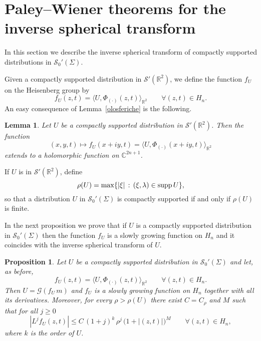 \documentclass[12pt,a4paper]{amsart}
\theoremstyle{plain}
\newtheorem{lemma}[theorem]{Lemma}
\newtheorem{proposition}[theorem]{Proposition}
\theoremstyle{definition}
\numberwithin{equation}{section}
\begin{document}
\section{Paley--Wiener theorems for the inverse spherical transform }

In this section we describe the inverse spherical transform
of compactly supported distributions in ${\mathcal S}_0'({\Sigma})$.

Given a compactly supported distribution in ${\mathcal S}'({\mathbb R}^2)$,
we define the function $f_U$ on the Heisenberg group by
$$
f_U(z,t)={\langle {U},{\Phi_{(\cdot)}(z,t)} \rangle_{{\mathbb R}^2}}\qquad \forall  (z,t)\in{{H_{n}}}.
$$ 
An easy consequence of 
 Lemma~\ref{olosferiche} is the following.

\begin{lemma}\label{oloinv}
Let $U$ be a compactly supported distribution in ${\mathcal S}'({\mathbb R}^2)$.
 Then the function
$$
(x,y,t)\mapsto f_U(x+iy,t)={\langle {U},{\Phi_{(\cdot)}(x+iy,t)} \rangle_{{\mathbb R}^2}}
$$ 
extends to a holomorphic function   on ${\mathbb C}^{2{n}+1}$.
\end{lemma}
 

If $U$ is in ${\mathcal S}'({\mathbb R}^2)$, define
 $$
{\rho} (U)=
{\rm max}{\left\{{|\xi|\, :\, (\xi,{\lambda})\in {\rm supp}\, U}\right\}},
$$
 so that
  a distribution $U$ in ${\mathcal S}_0'({\Sigma})$  is compactly supported 
 if and only if $\rho(U)$ is finite.

In the next proposition we prove that if $U$ is 
a compactly supported distribution in ${\mathcal S}_0'({\Sigma})$ then the function $f_U$
is a slowly growing function on ${{H_{n}}}$ and it coincides with 
the inverse spherical transform of $U$.   

\begin{proposition}\label{invtemp}
Let $U$ be a compactly supported distribution in ${\mathcal S}_0'({\Sigma})$ and let, as before,
$$
f_U(z,t)={\langle {U},{\Phi_{(\cdot)}(z,t)} \rangle_{{\mathbb R}^2}}\qquad \forall  (z,t)\in{{H_{n}}}.
$$ 
Then $  U={\mathcal G}(f_U\,m)$ and $f_U$ is a  slowly growing function on ${{H_{n}}}$ together  with all its derivatives. Moreover, for every $\rho>{\rho}(U)$
there exist $C=C_\rho$ and $M$ such that for all $j\geq 0$ 
\begin{equation}
\label{e:Lj}
 \left|
     L^j f_U(z,t)
     \right|
     \leq C \,(1+j)^k\, \rho^j\, \big(1+|(z,t)|\big)^M
     \qquad \forall (z,t)\in {{H_{n}}},
\end{equation}
where $k$ is the order of $U$.
\end{proposition}
\end{document}
